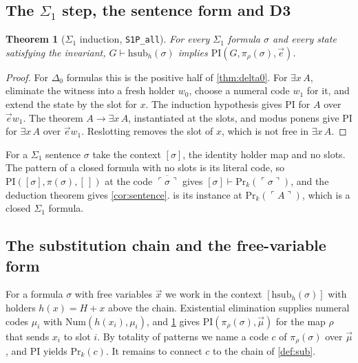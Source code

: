 \documentclass[11pt]{article}
\theoremstyle{plain}
\newtheorem{theorem}{Theorem}[section]
\theoremstyle{definition}
\theoremstyle{remark}
\newcommand{\Prv}{\mathrm{Pr}}
\newcommand{\gn}[1]{\ulcorner #1 \urcorner}
\newcommand{\num}[1]{\overline{#1}}
\newcommand{\Num}{\mathrm{Num}}
\newcommand{\PRI}{\mathrm{PI}}
\newcommand{\rocq}[1]{\texttt{#1}}
\begin{document}
\subsection{The \texorpdfstring{$\Sigma_1$}{Sigma-1} step, the sentence form and D3}\label{sec:sigma1}

\begin{theorem}[$\Sigma_1$ induction, \rocq{S1P\_all}]\label{thm:s1}
For every $\Sigma_1$ formula $\sigma$ and every state satisfying the
invariant, $G \vdash \mathrm{hsub}_h(\sigma)$ implies
$\PRI(G, \pi_\rho(\sigma), \vec e)$.
\end{theorem}

\begin{proof}
For $\Delta_0$ formulas this is the positive half of \cref{thm:delta0}.
For $\exists x\, A$, eliminate the witness into a fresh holder $w_0$,
choose a numeral code $w_1$ for it, and extend the state by the slot for
$x$.  The induction hypothesis gives $\PRI$ for $A$ over
$\vec e w_1$.  The theorem $A \to \exists x\, A$, instantiated at the
slots, and modus ponens give $\PRI$ for $\exists x\,A$ over
$\vec e w_1$.  Reslotting removes the slot of $x$, which is not free in
$\exists x\,A$.
\end{proof}

For a $\Sigma_1$ sentence $\sigma$ take the context $[\sigma]$, the
identity holder map and no slots.  The pattern of a closed formula with
no slots is its literal code, so $\PRI([\sigma], \pi(\sigma), [\,])$ at
the code $\num{\gn\sigma}$ gives $[\sigma] \vdash \Prv_k(\gn{\sigma})$,
and the deduction theorem gives \cref{cor:sentence}.   is
its instance at $\Prv_k(\gn{A})$, which is a closed $\Sigma_1$ formula.

\subsection{The substitution chain and the free-variable form}\label{sec:chain}

For a formula $\sigma$ with free variables $\vec x$ we work in the
context $[\mathrm{hsub}_h(\sigma)]$ with holders
$h(x) = H + x$ above the chain.  Existential elimination supplies
numeral codes $\mu_i$ with $\Num(h(x_i), \mu_i)$, and
\cref{thm:s1} gives $\PRI(\pi_\rho(\sigma), \vec\mu)$ for the map $\rho$
that sends $x_i$ to slot $i$.  By totality of patterns we name a code
$c$ of $\pi_\rho(\sigma)$ over $\vec\mu$, and $\PRI$ yields
$\Prv_k(c)$.  It remains to connect $c$ to the chain of
\cref{def:sub}.
\end{document}
